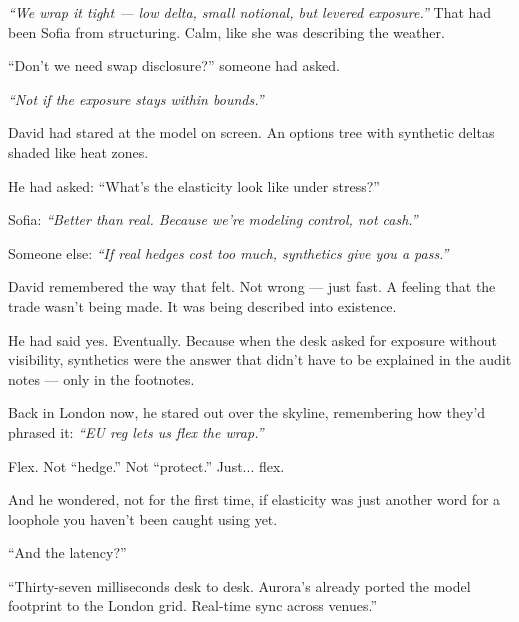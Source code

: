 \textit{“We wrap it tight — low delta, small notional, but levered exposure.”}
That had been Sofia from structuring. Calm, like she was describing the weather.

“Don’t we need swap disclosure?” someone had asked.

\textit{“Not if the exposure stays within bounds.”}

David had stared at the model on screen.
An options tree with synthetic deltas shaded like heat zones.

He had asked:
“What's the elasticity look like under stress?”

Sofia:
\textit{“Better than real. Because we’re modeling control, not cash.”}

Someone else:
\textit{“If real hedges cost too much, synthetics give you a pass.”}

David remembered the way that felt. Not wrong — just fast.
A feeling that the trade wasn't being made. It was being described into existence.

He had said yes. Eventually.
Because when the desk asked for exposure without visibility,
synthetics were the answer that didn’t have to be explained in the audit notes —
only in the footnotes.

\medskip

Back in London now, he stared out over the skyline,
remembering how they’d phrased it:
\textit{“EU reg lets us flex the wrap.”}

Flex. Not “hedge.” Not “protect.”
Just... flex.

And he wondered, not for the first time,
if elasticity was just another word for a loophole
you haven't been caught using yet.


“And the latency?”

“Thirty-seven milliseconds desk to desk. Aurora’s already ported the model footprint to the London grid. 
Real-time sync across venues.”

\medskip

